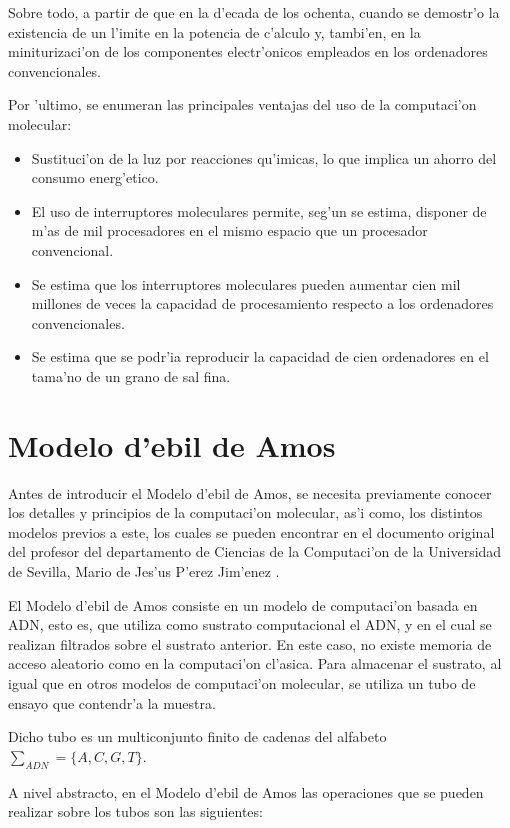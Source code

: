 \documentclass[12pt]{article}
\begin{document}
Sobre todo, a partir de que en la d'ecada de los ochenta, cuando se demostr'o la existencia de un l'imite en la potencia
de c'alculo y, tambi'en, en la miniturizaci'on de los componentes electr'onicos empleados en los ordenadores convencionales.

Por 'ultimo, se enumeran las principales ventajas del uso de la computaci'on molecular:

\begin{itemize}
	\item Sustituci'on de la luz por reacciones qu'imicas, lo que implica un ahorro del consumo energ'etico.
	\item El uso de interruptores moleculares permite, seg'un se estima, disponer de m'as de mil procesadores
    en el mismo espacio que un procesador convencional.
	\item Se estima que los interruptores moleculares pueden aumentar cien mil millones de veces la capacidad
    de procesamiento respecto a los ordenadores convencionales.
	\item Se estima que se podr'ia reproducir la capacidad de cien ordenadores en el tama'no de un grano de sal fina.
\end{itemize}

\section{Modelo d'ebil de Amos}

Antes de introducir el Modelo d'ebil de Amos, se necesita previamente conocer los detalles y principios
de la computaci'on molecular, as'i como, los distintos modelos previos a este, los cuales se pueden encontrar
en el documento original del profesor del departamento de Ciencias de la Computaci'on de la Universidad
de Sevilla, Mario de Jes'us P'erez Jim'enez \cite{Mario-deJesus}.

El Modelo d'ebil de Amos consiste en un modelo de computaci'on basada en ADN, esto es, que utiliza como sustrato
computacional el ADN, y en el cual se realizan filtrados sobre el sustrato anterior. En este caso, no existe
memoria de acceso aleatorio como en la computaci'on cl'asica. Para almacenar el sustrato, al igual que en otros
modelos de computaci'on molecular, se utiliza un tubo de ensayo que contendr'a la muestra.

Dicho tubo es un multiconjunto finito de cadenas del alfabeto $\sum_{ADN} = \{A, C, G, T\}$.

A nivel abstracto, en el Modelo d'ebil de Amos las operaciones que se pueden realizar sobre los tubos
son las siguientes:
\end{document}
